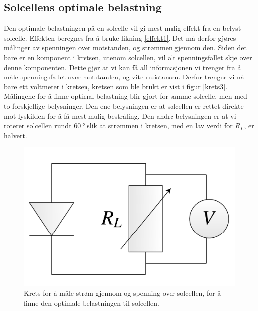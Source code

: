 \documentclass[%
 reprint,
 amsmath,amssymb,
 aps,
 norsk,
 booktabs
]{revtex4-1}
\begin{document}
\subsection{Solcellens optimale belastning}
Den optimale belastningen på en solcelle vil gi mest mulig effekt fra en belyst solcelle. Effekten beregnes fra å bruke likning \eqref{effekt1}. Det må derfor gjøres målinger av spenningen over motstanden, og strømmen gjennom den. Siden det bare er en komponent i kretsen, utenom solcellen, vil alt spenningsfallet skje over denne komponenten. Dette gjør at vi kan få all informasjonen vi trenger fra å måle spenningsfallet over motstanden, og vite resistansen. Derfor trenger vi nå bare ett voltmeter i kretsen, kretsen som ble brukt er vist i figur \vref{krets3}. Målingene for å finne optimal belastning blir gjort for samme solcelle, men med to forskjellige belysninger. Den ene belysningen er at solcellen er rettet direkte mot lyskilden for å få mest mulig bestråling. Den andre belysningen er at vi roterer solcellen rundt $\SI{60}{\degree}$ slik at strømmen i kretsen, med en lav verdi for $R_L$, er halvert.
\begin{figure}[h!]
  \centering
  \includegraphics[scale=0.1]{krets3.png}
  \caption{Krets for å måle strøm gjennom og spenning over solcellen, for å finne den optimale belastningen til solcellen.}
  \label{krets3}
\end{figure}
\end{document}
